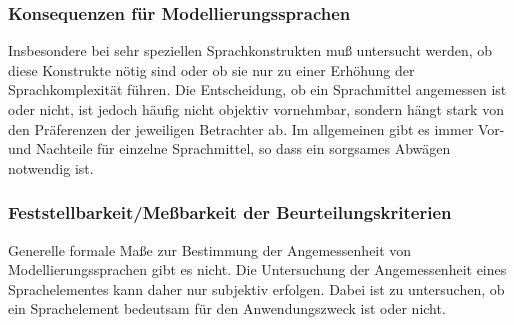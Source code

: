 \subsubsection{Konsequenzen für Modellierungssprachen}
Insbesondere bei sehr speziellen Sprachkonstrukten muß untersucht werden, ob diese Konstrukte nötig
sind oder ob sie nur zu einer Erhöhung der Sprachkomplexität führen. Die Entscheidung, ob ein
Sprachmittel angemessen ist oder nicht, ist jedoch häufig nicht objektiv vornehmbar, sondern hängt
stark von den Präferenzen der jeweiligen Betrachter ab. Im allgemeinen gibt es immer Vor- und Nachteile
für einzelne Sprachmittel, so dass ein sorgsames Abwägen notwendig ist.
\subsubsection{Feststellbarkeit/Meßbarkeit der Beurteilungskriterien} 
Generelle formale Maße zur Bestimmung der Angemessenheit von Modellierungssprachen gibt es
nicht. Die Untersuchung der Angemessenheit eines Sprachelementes kann daher nur subjektiv erfolgen.
Dabei ist zu untersuchen, ob ein Sprachelement bedeutsam für den Anwendungszweck ist oder
nicht.

